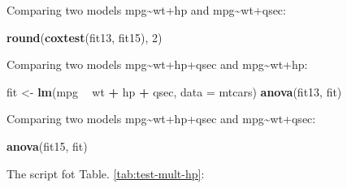 \documentclass[]{article}
\newenvironment{Shaded}{\begin{snugshade}}{\end{snugshade}}
\newcommand{\KeywordTok}[1]{\textcolor[rgb]{0.13,0.29,0.53}{\textbf{#1}}}
\newcommand{\DataTypeTok}[1]{\textcolor[rgb]{0.13,0.29,0.53}{#1}}
\newcommand{\DecValTok}[1]{\textcolor[rgb]{0.00,0.00,0.81}{#1}}
\newcommand{\StringTok}[1]{\textcolor[rgb]{0.31,0.60,0.02}{#1}}
\newcommand{\OperatorTok}[1]{\textcolor[rgb]{0.81,0.36,0.00}{\textbf{#1}}}
\newcommand{\NormalTok}[1]{#1}
\begin{document}
Comparing two models mpg\textasciitilde{}wt+hp and
mpg\textasciitilde{}wt+qsec:

\begin{Shaded}
\begin{Highlighting}[]
\KeywordTok{round}\NormalTok{(}\KeywordTok{coxtest}\NormalTok{(fit13, fit15), }\DecValTok{2}\NormalTok{)}
\end{Highlighting}
\end{Shaded}

Comparing two models mpg\textasciitilde{}wt+hp+qsec and
mpg\textasciitilde{}wt+hp:

\begin{Shaded}
\begin{Highlighting}[]
\NormalTok{fit <-}\StringTok{ }\KeywordTok{lm}\NormalTok{(mpg }\OperatorTok{~}\StringTok{ }\NormalTok{wt }\OperatorTok{+}\StringTok{ }\NormalTok{hp }\OperatorTok{+}\StringTok{ }\NormalTok{qsec, }\DataTypeTok{data =}\NormalTok{ mtcars)}
\KeywordTok{anova}\NormalTok{(fit13, fit)}
\end{Highlighting}
\end{Shaded}

Comparing two models mpg\textasciitilde{}wt+hp+qsec and
mpg\textasciitilde{}wt+qsec:

\begin{Shaded}
\begin{Highlighting}[]
\KeywordTok{anova}\NormalTok{(fit15, fit)}
\end{Highlighting}
\end{Shaded}

The script fot Table. \ref{tab:test-mult-hp}:
\end{document}
